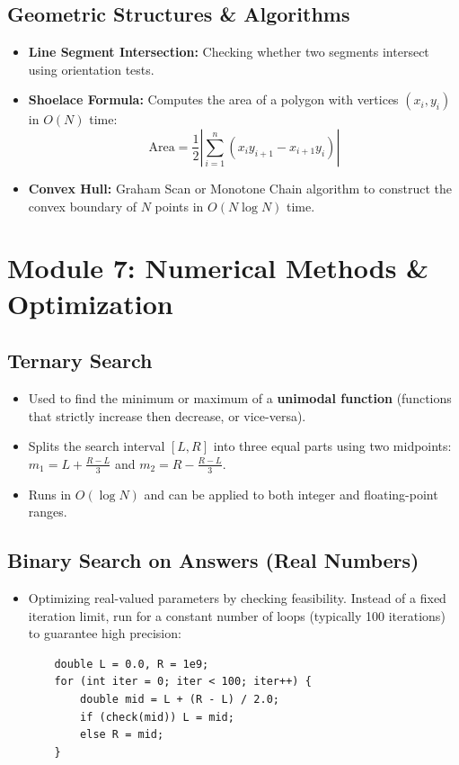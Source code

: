 \documentclass[10pt,journal,compsoc,onecolumn]{IEEEtran}
\begin{document}
\subsection{Geometric Structures \& Algorithms}
\begin{itemize}
    \item \textbf{Line Segment Intersection:} Checking whether two segments intersect using orientation tests.
    \item \textbf{Shoelace Formula:} Computes the area of a polygon with vertices $(x_i, y_i)$ in $O(N)$ time:
    \[
    \text{Area} = \frac{1}{2} \left| \sum_{i=1}^n (x_i y_{i+1} - x_{i+1} y_i) \right|
    \]
    \item \textbf{Convex Hull:} Graham Scan or Monotone Chain algorithm to construct the convex boundary of $N$ points in $O(N \log N)$ time.
\end{itemize}

\section{Module 7: Numerical Methods \& Optimization}
\label{sec:numerical}

\subsection{Ternary Search}
\begin{itemize}
    \item Used to find the minimum or maximum of a \textbf{unimodal function} (functions that strictly increase then decrease, or vice-versa).
    \item Splits the search interval $[L, R]$ into three equal parts using two midpoints: $m_1 = L + \frac{R-L}{3}$ and $m_2 = R - \frac{R-L}{3}$.
    \item Runs in $O(\log N)$ and can be applied to both integer and floating-point ranges.
\end{itemize}

\subsection{Binary Search on Answers (Real Numbers)}
\begin{itemize}
    \item Optimizing real-valued parameters by checking feasibility. Instead of a fixed iteration limit, run for a constant number of loops (typically 100 iterations) to guarantee high precision:
    \begin{verbatim}
    double L = 0.0, R = 1e9;
    for (int iter = 0; iter < 100; iter++) {
        double mid = L + (R - L) / 2.0;
        if (check(mid)) L = mid;
        else R = mid;
    }
    \end{verbatim}
\end{itemize}
\end{document}

